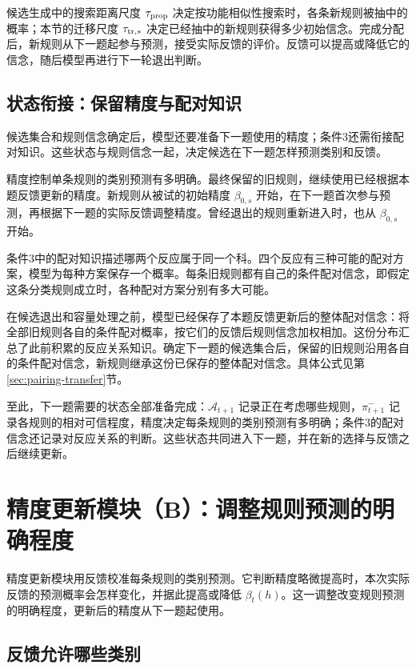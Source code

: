 \documentclass[12pt]{article}
\begin{document}
候选生成中的搜索距离尺度 $\tau_{\rm prop}$ 决定按功能相似性搜索时，各条新规则被抽中的概率；本节的迁移尺度 $\tau_{{\rm tr},s}$ 决定已经抽中的新规则获得多少初始信念。完成分配后，新规则从下一题起参与预测，接受实际反馈的评价。反馈可以提高或降低它的信念，随后模型再进行下一轮退出判断。

\subsection{状态衔接：保留精度与配对知识}

候选集合和规则信念确定后，模型还要准备下一题使用的精度；条件3还需衔接配对知识。这些状态与规则信念一起，决定候选在下一题怎样预测类别和反馈。

精度控制单条规则的类别预测有多明确。最终保留的旧规则，继续使用已经根据本题反馈更新的精度。新规则从被试的初始精度 $\beta_{0,s}$ 开始，在下一题首次参与预测，再根据下一题的实际反馈调整精度。曾经退出的规则重新进入时，也从 $\beta_{0,s}$ 开始。

条件3中的配对知识描述哪两个反应属于同一个科。四个反应有三种可能的配对方案，模型为每种方案保存一个概率。每条旧规则都有自己的条件配对信念，即假定这条分类规则成立时，各种配对方案分别有多大可能。

在候选退出和容量处理之前，模型已经保存了本题反馈更新后的整体配对信念：将全部旧规则各自的条件配对概率，按它们的反馈后规则信念加权相加。这份分布汇总了此前积累的反应关系知识。确定下一题的候选集合后，保留的旧规则沿用各自的条件配对信念，新规则继承这份已保存的整体配对信念。具体公式见第\ref{sec:pairing-transfer}节。

至此，下一题需要的状态全部准备完成：$\mathcal A_{t+1}$ 记录正在考虑哪些规则，$\pi_{t+1}^-$ 记录各规则的相对可信程度，精度决定每条规则的类别预测有多明确；条件3的配对信念还记录对反应关系的判断。这些状态共同进入下一题，并在新的选择与反馈之后继续更新。

\section{精度更新模块（B）：调整规则预测的明确程度}
\label{sec:precision}

精度更新模块用反馈校准每条规则的类别预测。它判断精度略微提高时，本次实际反馈的预测概率会怎样变化，并据此提高或降低 $\beta_t(h)$。这一调整改变规则预测的明确程度，更新后的精度从下一题起使用。

\subsection{反馈允许哪些类别}
\end{document}
